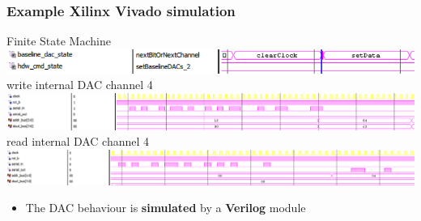 \documentclass[aspectratio=169]{beamer}
\begin{document}
	\begin{frame}
	\frametitle{Example Xilinx Vivado simulation}
		\begin{center}
			Finite State Machine \\
			\includegraphics[width=0.9 \textwidth]{IMG/Simulation1.png}
			\newline
			write internal DAC channel 4 \\
			\includegraphics[width=0.9 \textwidth]{IMG/Simulation3.png}
			\newline
			read internal DAC channel 4 \\
			{\hspace*{-5mm}
			\includegraphics[width=0.9 \textwidth]{IMG/Simulation4.png}}
		\end{center}
	\begin{itemize}
		\item The DAC behaviour is \textbf{simulated} by a \textbf{Verilog} module
	\end{itemize}
	\end{frame}
\end{document}
